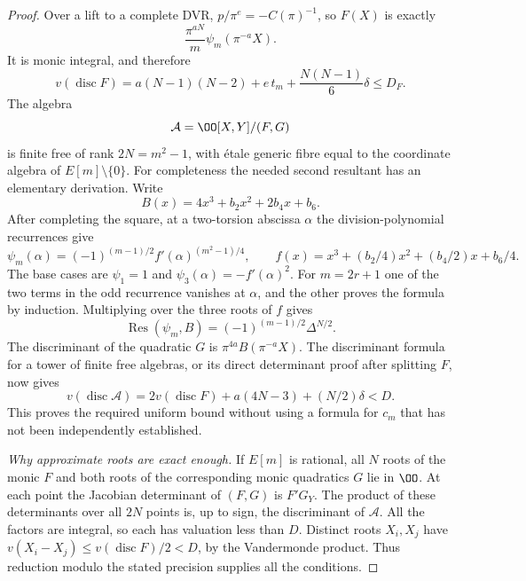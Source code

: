 \begin{proof}
Over a lift to a complete DVR, $p/\pi^e=-C(\pi)^{-1}$, so $F(X)$ is exactly
\[
                 \frac{\pi^{aN}}{m}\psi_m(\pi^{-a}X).
\]
It is monic integral, and therefore
\[
 v(\operatorname{disc}F)
   =a(N-1)(N-2)+e\,t_m+\frac{N(N-1)}6\delta
   \leq D_F.
\]
The algebra
\[
                 \mathcal A=\OO[X,Y]/(F,G)
\]
is finite free of rank $2N=m^2-1$, with \'etale generic fibre equal to the coordinate algebra of $E[m]\setminus\{0\}$.
For completeness the needed second resultant has an elementary derivation.  Write
\[
 B(x)=4x^3+b_2x^2+2b_4x+b_6.
\]
After completing the square, at a two-torsion abscissa $\alpha$ the division-polynomial recurrences give
\[
 \psi_m(\alpha)=(-1)^{(m-1)/2}
         f'(\alpha)^{(m^2-1)/4},\qquad
 f(x)=x^3+(b_2/4)x^2+(b_4/2)x+b_6/4.
\]
The base cases are $\psi_1=1$ and $\psi_3(\alpha)=-f'(\alpha)^2$.
For $m=2r+1$ one of the two terms in the odd recurrence vanishes at $\alpha$, and the other proves the formula by induction.  Multiplying over the three roots of $f$ gives
\[
                 \operatorname{Res}(\psi_m,B)
                     =(-1)^{(m-1)/2}\Delta^{N/2}.
\]
The discriminant of the quadratic $G$ is $\pi^{4a}B(\pi^{-a}X)$.
The discriminant formula for a tower of finite free algebras, or its direct determinant proof after splitting $F$, now gives
\[
 v(\operatorname{disc}\mathcal A)
 =2v(\operatorname{disc}F)+a(4N-3)+(N/2)\delta<D.
\]
This proves the required uniform bound without using a formula for $c_m$ that has not been independently established.

\emph{Why approximate roots are exact enough.}
If $E[m]$ is rational, all $N$ roots of the monic $F$ and both roots of the corresponding monic quadratics $G$ lie in $\OO$.  At each point the Jacobian determinant of $(F,G)$ is $F'G_Y$.  The product of these determinants over all $2N$ points is, up to sign, the discriminant of $\mathcal A$.  All the factors are integral, so each has valuation less than $D$.  Distinct roots $X_i,X_j$ have $v(X_i-X_j)\leq v(\operatorname{disc}F)/2<D$, by the Vandermonde product.  Thus reduction modulo the stated precision supplies all the conditions.


\end{proof}
